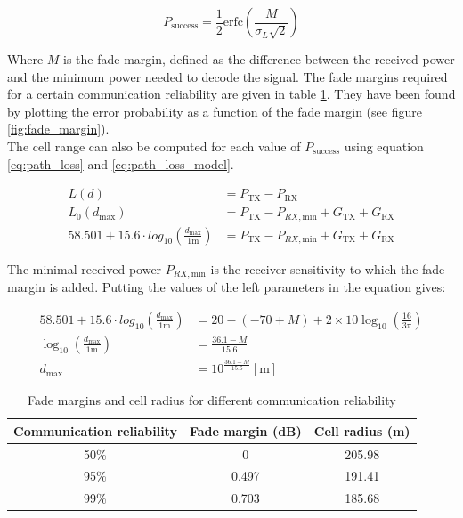 \documentclass[10pt,a4paper]{ULBreport}
\begin{document}
\begin{equation}
    \label{eq:path_loss_probability}
    P_{\text{success}} = \frac{1}{2} \text{erfc}\left(\frac{M}{\sigma_L\sqrt{2}}\right) 
\end{equation}

Where $M$ is the fade margin, defined as the difference between the received power and the minimum power needed to decode the signal. The fade margins required for a certain communication reliability are given in table \ref{tab:fade_margins}. They have been found by plotting the error probability as a function of the fade margin (see figure \ref{fig:fade_margin}). \\
The cell range can also be computed for each value of $P_{\text{success}}$ using equation \ref{eq:path_loss} and \ref{eq:path_loss_model}. 

\begin{align*}
    L(d) &= P_{\text{TX}} - P_{\text{RX}}\\
    L_0(d_\text{max}) &= P_{\text{TX}} - P_{RX, \text{min}} + G_{\text{TX}} + G_{\text{RX}}\\
    58.501 + 15.6 \cdot log_{10} \left(\frac{d_{\text{max}}}{1\text{m}}\right) &= P_{\text{TX}} - P_{RX, \text{min}} + G_{\text{TX}} + G_{\text{RX}}
\end{align*}

The minimal received power $P_{RX, \text{min}}$ is the receiver sensitivity to which the fade margin is added. Putting the values of the left parameters in the equation gives:

\begin{align*}
    58.501 + 15.6 \cdot log_{10} \left(\frac{d_{\text{max}}}{1\text{m}}\right) &= 20 - (-70 + M) + 2 \times 10 \log_{10} \left(\frac{16}{3\pi}\right)\\
    \log_{10} \left(\frac{d_{\text{max}}}{1\text{m}}\right) &= \frac{36.1 - M}{15.6}\\
    d_{\text{max}} &= 10^{\frac{36.1 - M}{15.6}} \left[\text{m}\right]
\end{align*}

\begin{table}[H]
    \centering
    \begin{tabular}{|c|c|c|}
        \hline
        Communication reliability & Fade margin (dB) & Cell radius (m) \\ \hline
        50\% & 0 & 205.98 \\ \hline
        95\% & 0.497 & 191.41 \\ \hline
        99\% & 0.703 & 185.68 \\ \hline
    \end{tabular}
    \caption{Fade margins and cell radius for different communication reliability}
    \label{tab:fade_margins}
\end{table}
\end{document}
